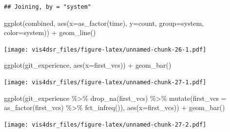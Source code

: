 \documentclass[
]{krantz}
\makeatletter
\newenvironment{Shaded}{\begin{snugshade}}{\end{snugshade}}
\newcommand{\AttributeTok}[1]{\textcolor[rgb]{0.61,0.61,0.61}{#1}}
\newcommand{\FunctionTok}[1]{\textcolor[rgb]{0,0,0}{#1}}
\newcommand{\NormalTok}[1]{#1}
\newcommand{\SpecialCharTok}[1]{\textcolor[rgb]{0,0,0}{#1}}
\newenvironment{kframe}{%
\medskip{}
\setlength{\fboxsep}{.8em}
 \def\at@end@of@kframe{}%
 \ifinner\ifhmode%
  \def\at@end@of@kframe{\end{minipage}}%
  \begin{minipage}{\columnwidth}%
 \fi\fi%
 \def\FrameCommand##1{\hskip\@totalleftmargin \hskip-\fboxsep
 \colorbox{shadecolor}{##1}\hskip-\fboxsep
     \hskip-\linewidth \hskip-\@totalleftmargin \hskip\columnwidth}%
 \MakeFramed {\advance\hsize-\width
   \@totalleftmargin\z@ \linewidth\hsize
   \@setminipage}}%
 {\par\unskip\endMakeFramed%
 \at@end@of@kframe}
\renewenvironment{Shaded}{\begin{kframe}}{\end{kframe}}
\makeatother
\begin{document}
\begin{verbatim}
## Joining, by = "system"
\end{verbatim}

\begin{Shaded}
\begin{Highlighting}[]
\FunctionTok{ggplot}\NormalTok{(combined, }\FunctionTok{aes}\NormalTok{(}\AttributeTok{x=}\FunctionTok{as\_factor}\NormalTok{(time), }\AttributeTok{y=}\NormalTok{count, }\AttributeTok{group=}\NormalTok{system, }\AttributeTok{color=}\NormalTok{system)) }\SpecialCharTok{+}
  \FunctionTok{geom\_line}\NormalTok{()}
\end{Highlighting}
\end{Shaded}

\texttt{[image: vis4dsr\_files/figure-latex/unnamed-chunk-26-1.pdf]}

\begin{Shaded}
\begin{Highlighting}[]
\FunctionTok{ggplot}\NormalTok{(git\_experience, }\FunctionTok{aes}\NormalTok{(}\AttributeTok{x=}\NormalTok{first\_vcs)) }\SpecialCharTok{+}
  \FunctionTok{geom\_bar}\NormalTok{()}
\end{Highlighting}
\end{Shaded}

\texttt{[image: vis4dsr\_files/figure-latex/unnamed-chunk-27-1.pdf]}

\begin{Shaded}
\begin{Highlighting}[]
\FunctionTok{ggplot}\NormalTok{(git\_experience }\SpecialCharTok{\%\textgreater{}\%}
         \FunctionTok{drop\_na}\NormalTok{(first\_vcs) }\SpecialCharTok{\%\textgreater{}\%}
         \FunctionTok{mutate}\NormalTok{(}\AttributeTok{first\_vcs =} \FunctionTok{as\_factor}\NormalTok{(first\_vcs) }\SpecialCharTok{\%\textgreater{}\%} 
             \FunctionTok{fct\_infreq}\NormalTok{()), }
         \FunctionTok{aes}\NormalTok{(}\AttributeTok{x=}\NormalTok{first\_vcs)) }\SpecialCharTok{+}
  \FunctionTok{geom\_bar}\NormalTok{()}
\end{Highlighting}
\end{Shaded}

\texttt{[image: vis4dsr\_files/figure-latex/unnamed-chunk-27-2.pdf]}
\end{document}
